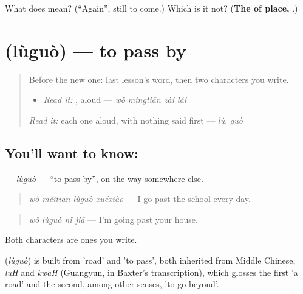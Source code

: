 \begin{tcolorbox}[breakable,colback=teal!4,colframe=teal!35!black,title={Before you move on}]
What does  mean? (\textquotedblleft{}Again\textquotedblright{}, still to come.) Which  is it not? (\textbf{The  of place, }.)
\end{tcolorbox}
\section[\texorpdfstring{\zh{路过} (lùguò)}{路过 (lùguò)}]{ (lùguò) — to pass by}

\label{lesson:ZH-C283-luguo}



\begin{quote}
Before the new one: last lesson's word, then two characters you write.

\begin{itemize}
\raggedright
  \item \emph{Read it:} , aloud — \emph{wǒ míngtiān zài lái}
\end{itemize}

\begin{quote}
 
\end{quote}

\emph{Read it:} each one aloud, with nothing said first — \emph{lù}, \emph{guò}
\end{quote}

\subsection*{You'll want to know: }
\textbf{} — \emph{lùguò} — \textquotedblleft{}to pass by\textquotedblright{}, on the way somewhere else.

\begin{quote}
\textbf{} \emph{wǒ měitiān lùguò xuéxiào} — I go past the school every day.
\end{quote}

\begin{quote}
\textbf{} \emph{wǒ lùguò nǐ jiā} — I'm going past your house.
\end{quote}

Both characters are ones you write.

\begin{cousinweb}
\textbf{} (\emph{lùguò}) is built from  'road' and  'to pass', both inherited from Middle Chinese, \emph{luH} and \emph{kwaH} (Guangyun, in Baxter's transcription), which glosses the first 'a road' and the second, among other senses, 'to go beyond'.
\end{cousinweb}

